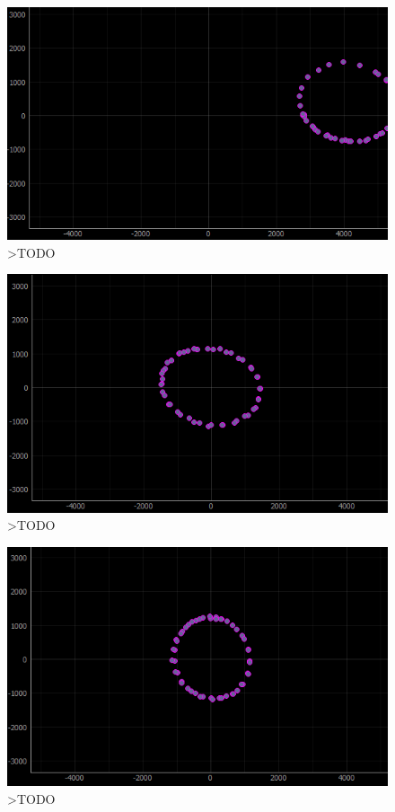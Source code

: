 \begin{figure}[ht]
	\centering
		\includegraphics[width=0.8\linewidth]{rys/ScanBot-08-2d-calibration-theta-sigma.PNG}
	\caption{>TODO}
	\label{fig:xxx}
\end{figure}

\begin{figure}[ht]
	\centering
		\includegraphics[width=0.8\linewidth]{rys/ScanBot-10-2d-calibration-theta-sigma-2-added-hard-offset-reset-data-so-soft-iron-values-are-proper.PNG}
	\caption{>TODO}
	\label{fig:xxx}
\end{figure}

\begin{figure}[ht]
	\centering
		\includegraphics[width=0.8\linewidth]{rys/ScanBot-11-2d-set-theta-then-sigma-and-done.PNG}
	\caption{>TODO}
	\label{fig:xxx}
\end{figure}


